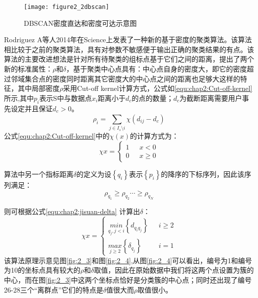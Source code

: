 \begin{figure}[h]
\centering
\texttt{[image: figure2\_2dbscan]}
\caption{DBSCAN密度直达和密度可达示意图}
\label{fig:figure2_2dbscan}
\end{figure}
\par Rodriguez A等人2014年在Science上发表了一种新的基于密度的聚类算法。该算法相比较于之前的聚类算法，具有对参数不敏感便于输出正确的聚类结果的有点。该算法的主要改进想法是针对所有待聚类的组标点基于它们之间的距离，提出了两个新的标准属性：$\rho$和$\delta$，基于聚类中心点具有：中心点自身的密度大，即它的密度超过邻域集合点的密度同时距离其它密度大的中心点之间的距离也足够大这样的特征，其中局部密度$\rho$采用Cut-off kernel计算方式，公式如\ref{equ:chap2:Cut-off-kernel}所示,其中$p_{i}$表示S中与数据点$x_{i}$距离小于$d_{c}$的点的数量；$d_{c}$为截断距离需要用户事先设定并且保证$d_{c} >0$。
\begin{equation}
\label{equ:chap2:Cut-off-kernel}
\rho_{i}=\sum_{j \in I_{s}\setminus {i}}^{ }\chi (d_{ij}-d_{c})
\end{equation}
公式\ref{equ:chap2:Cut-off-kernel}中的$\chi(x)$的计算方式为：
\begin{equation}
\label{equ:chap2:chi-kernel}
\chi{x}=
\begin{cases}
1 & \mbox { $x<0$}\\
0 & \mbox { $x \geq  0$}
\end{cases}
\end{equation}
\par 算法中另一个指标距离$\delta$的定义为设$\left \{  q_{i} \right \}$表示$\left \{  p_{i} \right \}$的降序的下标序列，因此该序列满足：
\begin{equation}
\label{equ:chap2:se-delta}
\rho_{q_{1}} \geq \rho_{q_{2}} \cdots \geq \rho_{q_{N}}
\end{equation}
\par 则可根据公式\ref{equ:chap2:jisuan-delta} 计算出$\delta$：
\begin{equation}
\label{equ:chap2:jisuan-delta}
\chi{x}=
\begin{cases}
\underset{q_{j},j<i}{min} \left \{ d_{q_{i}q_{j}} \right \}  & \mbox { $i \geq 2$}\\
\underset{j\geq 2}{max} \left \{ \delta_{q_{j}} \right \} & \mbox { $i=1$}
\end{cases}
\end{equation}
该算法原理示意见图\ref{fig:2_3}和图\ref{fig:2_4},从图\ref{fig:2_4}可以看出，编号为1和编号为10的坐标点具有较大的$\rho$和$\delta$取值，因此在原始数据中我们将这两个点设置为簇的中心，而在图\ref{fig:2_3}中这两个坐标点恰好是分类簇的中心点；同时还出现了编号26-28三个“离群点”它们的特点是$\delta$值很大而$\rho$取值很小。
